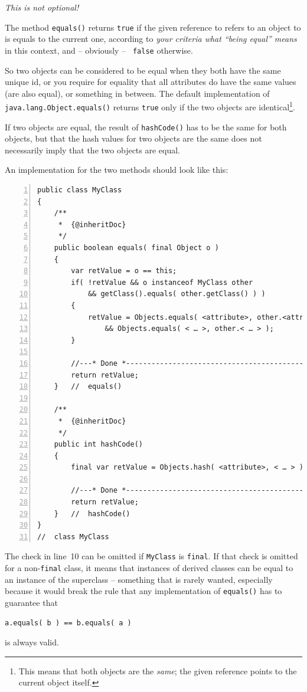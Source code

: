 \documentclass[11pt,a4paper, titlepage, parskip=half, headsepline, footsepline, cleardoublepage=current, headheight=1cm]{scrbook}
\begin{document}
\textit{This is not optional!}

The method \lstinline|equals()| returns \lstinline|true| if the given reference to refers to an object to is equals to the current one, according to \textit{your criteria what “being equal” means} in this context, and – obviously – \lstinline| false| otherwise.

So two objects can be considered to be equal when they both have the same unique id, or you require for equality that all attributes do have the same values (are also equal), or something in between. The default implementation of \lstinline|java.lang.Object.equals()| returns \lstinline|true| only if the two objects are identical\footnote{This means that both objects are the \textit{same}; the given reference points to the current object itself.}.

If two objects are equal, the result of \lstinline|hashCode()| has to be the same for both objects, but that the hash values for two objects are the same does not necessarily imply that the two objects are equal.

An implementation for the two methods should look like this:
\begin{lstlisting}[numbers=left,caption={Methods equals() and hashCode()}]
public class MyClass
{
    /**
     *  {@inheritDoc}
     */
    public boolean equals( final Object o )
    {
        var retValue = o == this;
        if( !retValue && o instanceof MyClass other
            && getClass().equals( other.getClass() ) )
        {
            retValue = Objects.equals( <attribute>, other.<attribute> )
                && Objects.equals( < … >, other.< … > );
        }
            
        //---* Done *------------------------------------------------
        return retValue;
    }   //  equals()
    
    /**
     *  {@inheritDoc}
     */
    public int hashCode()
    {
        final var retValue = Objects.hash( <attribute>, < … > );
        
        //---* Done *------------------------------------------------
        return retValue;
    }   //  hashCode()    
}
//  class MyClass
\end{lstlisting}
The check in line~10 can be omitted if \lstinline|MyClass| is \lstinline|final|. If that check is omitted for a non-\lstinline|final| class, it means that instances of derived classes can be equal to an instance of the superclass – something that is rarely wanted, especially because it would break the rule that any implementation of \lstinline|equals()| has to guarantee that
\begin{lstlisting}
a.equals( b ) == b.equals( a )
\end{lstlisting}
is always valid.
\end{document}

